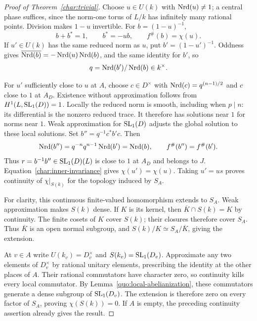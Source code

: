\begin{proof}[Proof of Theorem~\ref{char:trivial}]
Choose $u\in U(k)$ with $\operatorname{Nrd}(u)\ne1$; a central phase suffices,
since the norm-one torus of $L/k$ has infinitely many rational points.
Division makes $1-u$ invertible. For $b=(1-u)^{-1}$,
\begin{equation}\label{char:final-b}
 b+b^*=1,\qquad b^*=-ub,\qquad f^\#(b)=\chi(u).
\end{equation}
If $u'\in U(k)$ has the same reduced norm as $u$, put
$b'=(1-u')^{-1}$. Oddness gives
$\overline{\operatorname{Nrd}(b)}=-\operatorname{Nrd}(u)\operatorname{Nrd}(b)$, and the same identity for $b'$,
so
\[
 q=\operatorname{Nrd}(b')/\operatorname{Nrd}(b)\in k^\times.
\]

For $u'$ sufficiently close to $u$ at $A$, choose $c\in D^\times$
with $\operatorname{Nrd}(c)=q^{(n-1)/2}$ and $c$ close to $1$ at $A_D$.
Existence without approximation follows from $H^1(L,\operatorname{SL}_1(D))=1$.
Locally the reduced norm is smooth, including when $p\mid n$:
its differential is the nonzero reduced trace. It therefore has
solutions near $1$ for norms near $1$. Weak approximation for
$\operatorname{SL}_1(D)$ adjusts the global solution to these local solutions.
Set $b''=q^{-1}c^*b'c$. Then
\[
 \operatorname{Nrd}(b'')=q^{-n}q^{n-1}\operatorname{Nrd}(b')=\operatorname{Nrd}(b),
 \qquad f^\#(b'')=f^\#(b').
\]
Thus $r=b^{-1}b''\in\operatorname{SL}_1(D)(L)$ is close to $1$ at $A_D$ and
belongs to $J$. Equation~\ref{char:inner-invariance} gives
$\chi(u')=\chi(u)$. Taking $u'=us$ proves continuity of
$\chi|_{S(k)}$ for the topology induced by $S_A$.

For clarity, this continuous finite-valued homomorphism extends to
$S_A$. Weak approximation makes $S(k)$ dense. If $K$ is its kernel,
then $\overline K\cap S(k)=K$ by continuity. The finite cosets of
$K$ cover $S(k)$; their closures therefore cover $S_A$. Thus
$\overline K$ is an open normal subgroup, and
$S(k)/K\simeq S_A/\overline K$, giving the extension.

At $v\in A$ write $U(k_v)=D_v^\times$ and
$S(k_v)=\operatorname{SL}_1(D_v)$. Approximate any two elements of $D_v^\times$
by rational unitary elements, prescribing the identity at the other
places of $A$. Their rational commutators have character zero, so
continuity kills every local commutator. By
Lemma~\ref{quo:local-abelianization}, these commutators generate a
dense subgroup of $\operatorname{SL}_1(D_v)$. The extension is therefore zero on
every factor of $S_A$, proving $\chi(S(k))=0$. If $A$ is empty,
the preceding continuity assertion already gives the result.
\end{proof}
